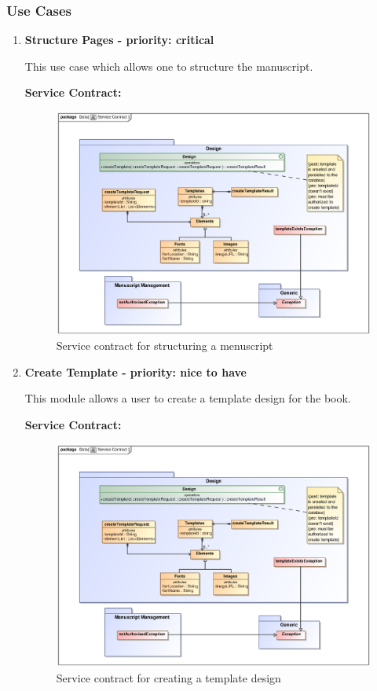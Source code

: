 \subsubsection{Use Cases}
\begin{enumerate}
\item \textbf{Structure Pages - priority: critical}
\par{This use case which allows one to structure the  manuscript.}
\par{\textbf{Service Contract:}
}
\begin{figure}[h]
\includegraphics[scale=0.8,width=400px]{epsImages/Design/createTemplateServiceContract.eps}
\centering
\caption{Service contract for structuring a menuscript}
\end{figure}

\newpage
\item \textbf{Create Template - priority: nice to have}
\par{This module allows a user to create a template design for the book.}
\par{\textbf{Service Contract:} 
}
 \begin{figure}[h]
\includegraphics[scale=0.8,width=400px]{epsImages/Design/createTemplateServiceContract.eps}
\centering
\caption{Service contract for creating a template design}
\end{figure}


\end{enumerate}
